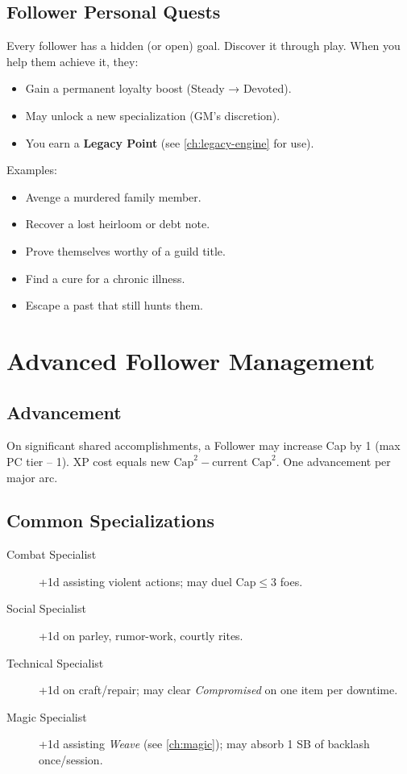 \subsection*{Follower Personal Quests}
\label{sec:follower-personal-quests}
Every follower has a hidden (or open) goal. Discover it through play. When you help them achieve it, they:
\begin{itemize}
  \item Gain a permanent loyalty boost (Steady → Devoted).
  \item May unlock a new specialization (GM's discretion).
  \item You earn a \textbf{Legacy Point} (see \ref{ch:legacy-engine} for use).
\end{itemize}
Examples:
\begin{itemize}
  \item Avenge a murdered family member.
  \item Recover a lost heirloom or debt note.
  \item Prove themselves worthy of a guild title.
  \item Find a cure for a chronic illness.
  \item Escape a past that still hunts them.
\end{itemize}

\section{Advanced Follower Management}

\subsection*{Advancement}
On significant shared accomplishments, a Follower may increase Cap by 1 (max PC tier -- 1). XP cost equals \(\text{new Cap}^2 - \text{current Cap}^2\). One advancement per major arc.

\subsection*{Common Specializations}
\begin{description}
  \item[Combat Specialist] +1d assisting violent actions; may duel Cap\(\leq\)3 foes.
  \item[Social Specialist] +1d on parley, rumor-work, courtly rites.
  \item[Technical Specialist] +1d on craft/repair; may clear \emph{Compromised} on one item per downtime.
  \item[Magic Specialist] +1d assisting \emph{Weave} (see \ref{ch:magic}); may absorb 1 SB of backlash once/session. 
\end{description}

